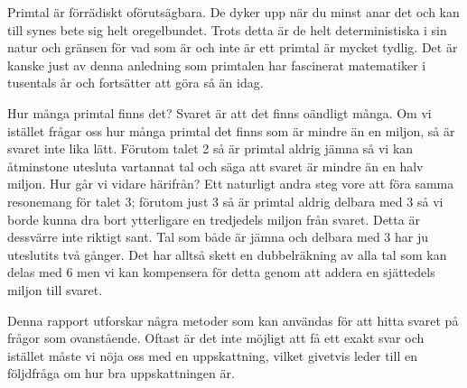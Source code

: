
Primtal är förrädiskt oförutsägbara.
De dyker upp när du minst anar det och kan till synes bete sig helt oregelbundet.
Trots detta är de helt deterministiska i sin natur och gränsen för vad som är och inte är ett primtal är mycket tydlig.
Det är kanske just av denna anledning som primtalen har fascinerat matematiker i tusentals år och fortsätter att göra så än idag.

Hur många primtal finns det? Svaret är att det finns oändligt många.
Om vi istället frågar oss hur många primtal det finns som är mindre än en miljon, så är svaret inte lika lätt.
Förutom talet 2 så är primtal aldrig jämna så vi kan åtminstone utesluta vartannat tal och säga att svaret är mindre än en halv miljon.
Hur går vi vidare härifrån?
Ett naturligt andra steg vore att föra samma resonemang för talet 3;
förutom just 3 så är primtal aldrig delbara med 3 så vi borde kunna dra bort ytterligare en tredjedels miljon från svaret.
Detta är dessvärre inte riktigt sant.
Tal som både är jämna och delbara med 3 har ju uteslutits två gånger.
Det har alltså skett en dubbelräkning av alla tal som kan delas med 6 men vi kan kompensera för detta genom att addera en sjättedels miljon till svaret.

\begin{comment}
Dubbelräkningen skedde eftersom vi hade två stycken mängder av tal som överlappade varandra och vi kompenserade genom att återlägga överlappet.

Denna idé kallas för \textit{inklusions-exklusionsprincipen} och kan även användas när vi har fler än bara två mängder.
Tag tre stycken mängder $A$,$B$ samt $C$, och låt överlappet mellan $A$ och $B$ betecknas med $AB$.
Om vi ska beskriva den sammanlagda mängden av $A$, $B$ och $C$ så måste vi 
Dessutom har vi $ABC$ där alla tre mängder överlappar vilken vi måste kompensera ytterligare för. Vi kan således beskriva den sammanlagda mängden av $A$, $B$ och $C$ som
\begin{equation*}
    (A+B+C) - (AB+BC+AC) + ABC
\end{equation*}
\end{comment}



Denna rapport utforskar några metoder som kan användas för att hitta svaret på frågor som ovanstående.
Oftast är det inte möjligt att få ett exakt svar och istället måste vi nöja oss med en uppskattning,
vilket givetvis leder till en följdfråga om hur bra uppskattningen är.



